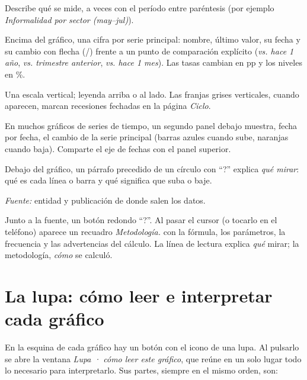 \begin{description}[style=nextline,leftmargin=0pt]
\item[Título] Describe qué se mide, a veces con el período entre paréntesis (por ejemplo
  \emph{Informalidad por sector (may--jul)}).
\item[Franja de cifras] Encima del gráfico, una cifra por serie principal: nombre, último valor, su fecha y
  su cambio con flecha (/) frente a un punto de comparación explícito (\emph{vs. hace 1 año},
  \emph{vs. trimestre anterior}, \emph{vs. hace 1 mes}). Las tasas cambian en pp y los niveles en \%.
\item[Área del gráfico] Una escala vertical; leyenda arriba o al lado. Las franjas grises verticales, cuando
  aparecen, marcan recesiones fechadas en la página \emph{Ciclo}.
\item[Panel de cambios] En muchos gráficos de series de tiempo, un segundo panel debajo muestra, fecha por
  fecha, el cambio de la serie principal (barras azules cuando sube, naranjas cuando baja). Comparte el eje de
  fechas con el panel superior.
\item[Línea de lectura ``?''] Debajo del gráfico, un párrafo precedido de un círculo con ``?'' explica
  \emph{qué mirar}: qué es cada línea o barra y qué significa que suba o baje.
\item[Pie de fuente] \emph{Fuente:} entidad y publicación de donde salen los datos.
\item[Tooltip de metodología] Junto a la fuente, un botón redondo ``?''. Al pasar el cursor (o tocarlo en el
  teléfono) aparece un recuadro \emph{Metodología.} con la fórmula, los parámetros, la frecuencia y las
  advertencias del cálculo. La línea de lectura explica \emph{qué} mirar; la metodología, \emph{cómo} se calculó.
\end{description}

\section{La lupa: cómo leer e interpretar cada gráfico}
\label{es:u:lupa}
En la esquina de cada gráfico hay un botón con el icono de una lupa. Al pulsarlo se abre la ventana
\emph{Lupa · cómo leer este gráfico}, que reúne en un solo lugar todo lo necesario para interpretarlo. Sus
partes, siempre en el mismo orden, son:

